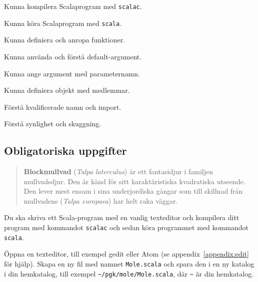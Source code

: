 
\Lab{\LabWeekTHREE}

\begin{Goals}
\item Kunna kompilera Scalaprogram med \texttt{scalac}.
\item Kunna köra Scalaprogram med \texttt{scala}.
\item Kunna definiera och anropa funktioner.
\item Kunna använda och förstå default-argument.
\item Kunna ange argument med parameternamn.
\item Kunna definiera objekt med medlemmar.
\item Förstå kvalificerade namn och import.
\item Förstå synlighet och skuggning.
\end{Goals}

\begin{Preparations}
\item {}
\item {} 
\end{Preparations}



\subsection{Obligatoriska uppgifter}


\begin{quote}
\textbf{Blockmullvad} (\textit{Talpa laterculus}) är ett fantasidjur i familjen mullvadsdjur. 
Den är känd för sitt karaktäristiska kvadratiska utseende.
Den lever mest ensam i sina underjordiska gångar som till skillnad från mullvadens (\emph{Talpa europaea}) har helt raka väggar.
\end{quote}

\begin{figure}
\end{figure}

\Task
Du ska skriva ett Scala-program med en vanlig texteditor och kompilera ditt program med kommandot \texttt{scalac} och sedan köra programmet med kommandot \texttt{scala}.

\Subtask
Öppna en texteditor, till exempel gedit eller Atom (se appendix~\ref{appendix:edit} för hjälp).
Skapa en ny fil med namnet \texttt{Mole.scala} och spara den i en ny katalog i din hemkatalog, till exempel \texttt{\textasciitilde/pgk/mole/Mole.scala}, där \texttt{\textasciitilde} är din hemkatalog.


